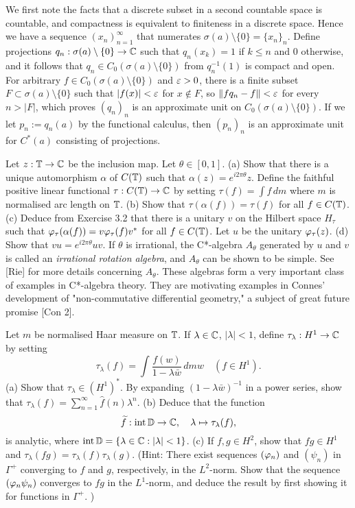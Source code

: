 \documentclass{../../small}
\begin{document}
\begin{sol}
We first note the facts that a discrete subset in a second countable space is countable, and compactness is equivalent to finiteness in a discrete space.
Hence we have a sequence $(x_n)_{n=1}^\infty$ that numerates $\sigma(a)\setminus\{0\}=\{x_n\}_n$.
Define projections $q_n:\sigma(a)\setminus\{0\}\to\mathbb{C}$ such that $q_n(x_k)=1$ if $k\le n$ and 0 otherwise, and it follows that $q_n\in C_0(\sigma(a)\setminus\{0\})$ from $q_n^{-1}(1)$ is compact and open.
For arbitrary $f\in C_0(\sigma(a)\setminus\{0\})$ and $\varepsilon>0$, there is a finite subset $F\subset\sigma(a)\setminus\{0\}$ such that $|f(x)|<\varepsilon$ for $x\notin F$, so $\|fq_n-f\|<\varepsilon$ for every $n>|F|$, which proves $(q_n)_n$ is an approximate unit on $C_0(\sigma(a)\setminus\{0\})$.
If we let $p_n:=q_n(a)$ by the functional calculus, then $(p_n)_n$ is an approximate unit for $C^*(a)$ consisting of projections.
\end{sol}


\begin{prb}
Let $z:\mathbb{T}\to\mathbb{C}$ be the inclusion map.
Let $\theta\in[0,1]$.
(a) Show that there is a unique automorphism $\alpha$ of $C(\mathbb{T})$ such that $\alpha(z)=e^{i2\pi\theta}z$.
Define the faithful positive linear functional $\tau:C(\mathbb{T})\to\mathbb{C}$ by setting $\tau(f)=\int f\,dm$ where $m$ is normalised arc length on $\mathbb{T}$.
(b) Show that $\tau(\alpha(f))=\tau(f)$ for all $f\in C(\mathbb{T})$.
(c) Deduce from Exercise 3.2 that there is a unitary $v$ on the Hilbert space $H_\tau$ such that $\varphi_\tau(\alpha(f))=v\varphi_\tau(f)v^*$ for all $f\in C(\mathbb{T})$.
Let $u$ be the unitary $\varphi_\tau(z)$.
(d) Show that $vu=e^{i2\pi\theta}uv$.
If $\theta$ is irrational, the C*-algebra $A_\theta$ generated by $u$ and $v$ is called an \emph{irrational rotation algebra}, and $A_\theta$ can be shown to be simple.
See [Rie] for more details concerning $A_\theta$.
These algebras form a very important class of examples in C*-algebra theory.
They are motivating examples in Connes' development of "non-commutative differential geometry," a subject of great future promise [Con 2].
\end{prb}
\begin{sol}
\end{sol}


\begin{prb}
Let $m$ be normalised Haar measure on $\mathbb{T}$.
If $\lambda\in\mathbb{C}$, $|\lambda|<1$, define $\tau_\lambda:H^1\to\mathbb{C}$ by setting
\[\tau_\lambda(f)=\int\frac{f(w)}{1-\lambda\bar w}\,dmw\quad(f\in H^1).\]
(a) Show that $\tau_\lambda\in(H^1)^*$.
By expanding $(1-\lambda\bar w)^{-1}$ in a power series, show that $\tau_\lambda(f)=\sum_{n=1}^\infty\hat f(n)\lambda^n$.
(b) Deduce that the function
\[\widetilde f:\operatorname{int}\mathbb{D}\to\mathbb{C},\quad\lambda\mapsto\tau_\lambda(f),\]
is analytic, where $\operatorname{int}\mathbb{D}=\{\lambda\in\mathbb{C}:|\lambda|<1\}$.
(c) If $f,g\in H^2$, show that $fg\in H^1$ and $\tau_\lambda(fg)=\tau_\lambda(f)\tau_\lambda(g)$.
(Hint: There exist sequences $(\varphi_n)$ and $(\psi_n)$ in $\Gamma^+$ converging to $f$ and $g$, respectively, in the $L^2$-norm.
Show that the sequence $(\varphi_n\psi_n)$ converges to $fg$ in the $L^1$-norm, and deduce the result by first showing it for functions in $\Gamma^+$. )
\end{prb}
\begin{sol}
\end{sol}
\end{document}
